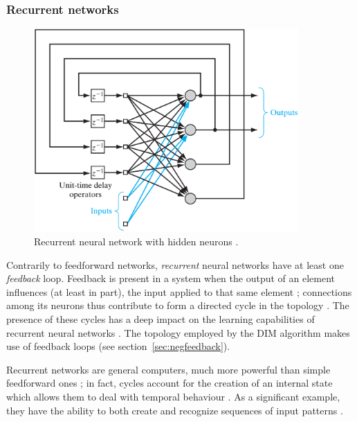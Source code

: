 \documentclass[11pt,a4paper]{report}
\begin{document}
				\subsubsection{Recurrent networks}
				\begin{figure}[t]
					\centering
					\includegraphics[width=0.9\textwidth]{recurrent}
					\caption{Recurrent neural network with hidden neurons \cite{haykin2009neural}.}
					\label{fig:recurrent}
				\end{figure}
				Contrarily to feedforward networks, \emph{recurrent} neural networks have at least one \emph{feedback} loop. Feedback is present in a system when the output of an element influences (at least in part), the input applied to that same element \cite{haykin2009neural}; connections among its neurons thus contribute to form a directed cycle in the topology \cite{yu2015recurrent}. The presence of these cycles has a deep impact on the learning capabilities of recurrent neural networks \cite{haykin2009neural}. The topology employed by the DIM algorithm makes use of feedback loops (see section~\ref{sec:negfeedback}).
				
				Recurrent networks are general computers, much more powerful than simple feedforward ones \cite{schmidhuber2015deep}; in fact, cycles account for the creation of an internal state which allows them to deal with temporal behaviour \cite{yu2015recurrent}. As a significant example, they have the ability to both create and recognize sequences of input patterns \cite{cleeremans1993mechanisms,pearlmutter1990dynamic}.
				
\end{document}
